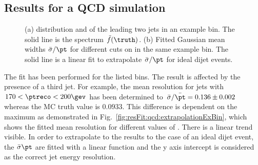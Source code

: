 \documentclass[a4paper]{cmspaper} %
\begin{document}
\subsection{Results for a QCD simulation}
\begin{figure}[ht]
  \begin{center}
     
  \end{center}
  \caption{(a) \ptpart distribution and of the leading two jets in an example \pt bin.
    The solid line is the spectrum $\tilde{f}(\truth)$.
    (b) Fitted Gaussian mean widths $\bar{\sigma}/\pt$ for different cuts on \ptrel in the same example \pt bin.
    The solid line is a linear fit to extrapolate $\bar{\sigma}/\pt$ for ideal dijet events.}
\end{figure}

The fit has been performed for the listed \pt bins.
The result is affected by the presence of a third jet.
For example, the mean resolution for jets with \mbox{$170 < \ptreco < 200\gev$} has been determined to \mbox{$\bar{\sigma}/\bar{\pt} = 0.136 \pm 0.002$} whereas the MC truth value is \mbox{$0.0933$}.
This difference is dependent on the maximum \ptrel as demonstrated in Fig.~\ref{fig:resFit:qcd:extrapolationExBin}, which shows the fitted mean resolution for different values of \ptrel.
There is a linear trend visible.
In order to extrapolate to the results to the case of an ideal dijet event, the $\bar{\sigma}\/\pt$ are fitted with a linear function and the y axis intercept is considered as the correct jet energy resolution.
\end{document}
